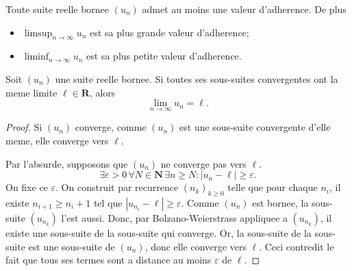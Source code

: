 \begin{proposition}
Toute suite reelle bornee $(u_{n})$ admet au moins une valeur d'adherence. De plus
\begin{itemize}
\item $\limsup_{ n \to \infty }u_{n}$ est sa plus grande valeur d'adherence;
\item $\liminf_{ n \to \infty }u_{n}$ est sa plus petite valeur d'adherence.
\end{itemize}
\end{proposition}
\begin{corollary}
Soit $(u_{n})$ une suite reelle bornee. Si toutes ses sous-suites convergentes ont la meme limite $\ell \in \mathbf{R}$, alors
$$
\lim_{ n \to \infty } u_{n}=\ell.
$$
\end{corollary}
\begin{proof}
Si $(u_{n})$ converge, comme $(u_{n})$ est une sous-suite convergente d'elle meme, elle converge vers $\ell$.

Par l'absurde, supposons que $(u_{n})$ ne converge pas vers $\ell$. 
$$
\exists\varepsilon>0\,\forall N\in \mathbf{N}\,\exists n\ge N:|u_{n}-\ell|\ge \varepsilon.
$$
On fixe ce $\varepsilon$. On construit par recurrence $(n_{k})_{k\ge 0}$ telle que pour chaque $n_{i}$, il existe $n_{i+1}\ge n_{i}+1$ tel que $|u_{n_{i}}-\ell|\ge \varepsilon$.  Comme $(u_{n})$ est bornee, la sous-suite $(u_{n_{k}})$ l'est aussi. Donc, par Bolzano-Weierstrass appliquee a $(u_{n_{k}})$, il existe une sous-suite de la sous-suite qui converge. Or, la sous-suite de la sous-suite est une sous-suite de $(u_{n})$, donc elle converge vers $\ell$. Ceci contredit le fait que tous ses termes sont a distance au moins $\varepsilon$ de $\ell$.
\end{proof}

